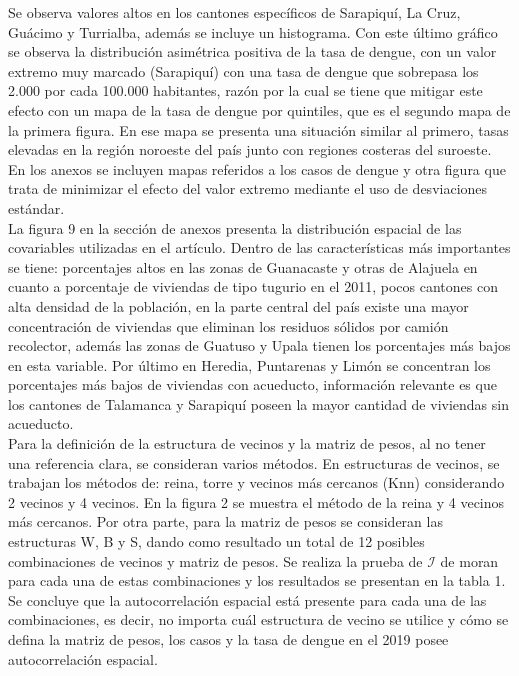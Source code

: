 \documentclass[a4paper,12pt]{report}
\begin{document}
Se observa valores altos en los cantones específicos de Sarapiquí, La Cruz, Guácimo y Turrialba, además se incluye un histograma. Con este último gráfico se observa la distribución asimétrica positiva de la tasa de dengue, con un valor extremo muy marcado (Sarapiquí) con una tasa de dengue que sobrepasa los 2.000 por cada 100.000 habitantes, razón por la cual se tiene que mitigar este efecto con un mapa de la tasa de dengue por quintiles, que es el segundo mapa de la primera figura. En ese mapa se presenta una situación similar al primero, tasas elevadas en la región noroeste del país junto con regiones costeras del suroeste. En los anexos se incluyen mapas referidos a los casos de dengue y otra figura que trata de minimizar el efecto del valor extremo mediante el uso de desviaciones estándar.\\
La figura 9 en la sección de anexos presenta la distribución espacial de las covariables utilizadas en el artículo. Dentro de las características más importantes se tiene: porcentajes altos en las zonas de Guanacaste y otras de Alajuela en cuanto a porcentaje de viviendas de tipo tugurio en el 2011, pocos cantones con alta densidad de la población, en la parte central del país  existe una mayor concentración de viviendas que eliminan los residuos sólidos por camión recolector, además las zonas de Guatuso y Upala tienen los porcentajes más bajos en esta variable. Por último en Heredia, Puntarenas y Limón se concentran los porcentajes más bajos de viviendas con acueducto, información relevante es que los cantones de Talamanca y Sarapiquí poseen la mayor cantidad de viviendas sin acueducto.\\ 
Para la definición de la estructura de vecinos y la matriz de pesos, al no tener una referencia clara, se consideran varios métodos. En estructuras de vecinos, se trabajan los métodos de: reina, torre y vecinos más cercanos (Knn) considerando 2 vecinos y 4 vecinos. En la figura 2 se muestra el método de la reina y 4 vecinos más cercanos. Por otra parte, para la matriz de pesos se consideran las estructuras W, B y S, dando como resultado un total de 12 posibles combinaciones de vecinos y matriz de pesos. Se realiza la prueba de $\mathcal{I}$ de moran para cada una de estas combinaciones y los resultados se presentan en la tabla 1. Se concluye que la autocorrelación espacial está presente para cada una de las combinaciones, es decir, no importa cuál estructura de vecino se utilice y cómo se defina la matriz de pesos, los casos y la tasa de dengue en el 2019 posee autocorrelación espacial.
\end{document}
